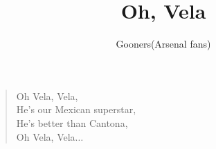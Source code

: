 \documentclass[a4paper,12pt]{article}
\title{Oh, Vela}
\author{Gooners(Arsenal fans)}
\date{}
\begin{document}
	
	\maketitle
	
	\begin{verse}
		
		Oh Vela, Vela, \\
		He's our Mexican superstar, \\
		He's better than Cantona, \\
		Oh Vela, Vela$\ldots$
		
	\end{verse}
	
\end{document}
